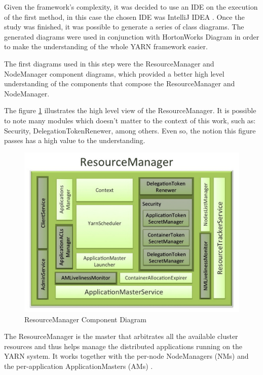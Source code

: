 Given the framework's complexity, it was decided to use an IDE on the execution of the first method, in this case the chosen IDE was IntelliJ IDEA \cite{IDEA}. Once the study was finished, it was possible to generate a series of class diagrams. The generated diagrams were used in conjunction with HortonWorks  Diagram in order to make the understanding of the whole YARN framework easier.

The first diagrams used in this step were the ResourceManager and NodeManager component diagrams, which provided a better high level understanding of the components that compose the ResourceManager and NodeManager.

The figure \ref{fig:RMHorton} illustrates the high level view of the ResourceManager. It is possible to note many modules which doesn't matter to the context of this work, such as: Security, DelegationTokenRenewer, among others. Even so, the notion this figure passes has a high value to the understanding.

\begin{figure}[hbtn]
   \renewcommand{\figurename}{Figure}
   \centering
   \includegraphics[width=15cm]{figuras/Figura14-RMHorton.png}
   \caption{ResourceManager Component Diagram \cite{HortonRM}}
   \label{fig:RMHorton}
\end{figure}

The ResourceManager is the master that arbitrates all the available cluster resources and thus helps manage the distributed applications running on the YARN system. It works together with the per-node NodeManagers (NMs) and the per-application ApplicationMasters (AMs) \cite{HortonRM}.

